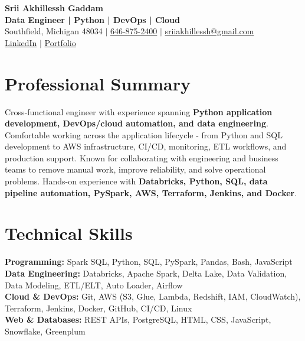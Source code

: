 \documentclass[letterpaper,10pt]{article}
\begin{document}
\fontsize{9.35pt}{10.45pt}\selectfont

\begin{center}
    {\LARGE \textbf{Srii Akhillessh Gaddam}} \\[-1pt]
    \textbf{Data Engineer | Python | DevOps | Cloud} \\[2pt]
    Southfield, Michigan 48034 $|$
    \href{tel:6468752400}{646-875-2400} $|$
    \href{mailto:sriiakhillessh@gmail.com}{sriiakhillessh@gmail.com} \\[1pt]
    \href{https://www.linkedin.com/in/srii-akhiilessh-gaddam-b48668191/}{LinkedIn} $|$
    \href{https://sriiakhillesshg.github.io/portfolio/}{Portfolio}
\end{center}
\vspace{-8pt}

\section{Professional Summary}
\small{Cross-functional engineer with experience spanning \textbf{Python application development, DevOps/cloud automation, and data engineering}. Comfortable working across the application lifecycle - from Python and SQL development to AWS infrastructure, CI/CD, monitoring, ETL workflows, and production support. Known for collaborating with engineering and business teams to remove manual work, improve reliability, and solve operational problems. Hands-on experience with \textbf{Databricks, Python, SQL, data pipeline automation, PySpark, AWS, Terraform, Jenkins, and Docker}.}

\section{Technical Skills}
\small{
\textbf{Programming:} Spark SQL, Python, SQL, PySpark, Pandas, Bash, JavaScript \\
\textbf{Data Engineering:} Databricks, Apache Spark, Delta Lake, Data Validation, Data Modeling, ETL/ELT, Auto Loader, Airflow \\
\textbf{Cloud \& DevOps:} Git, AWS (S3, Glue, Lambda, Redshift, IAM, CloudWatch), Terraform, Jenkins, Docker, GitHub, CI/CD, Linux \\
\textbf{Web \& Databases:} REST APIs, PostgreSQL, HTML, CSS, JavaScript, Snowflake, Greenplum
}

\end{document}
